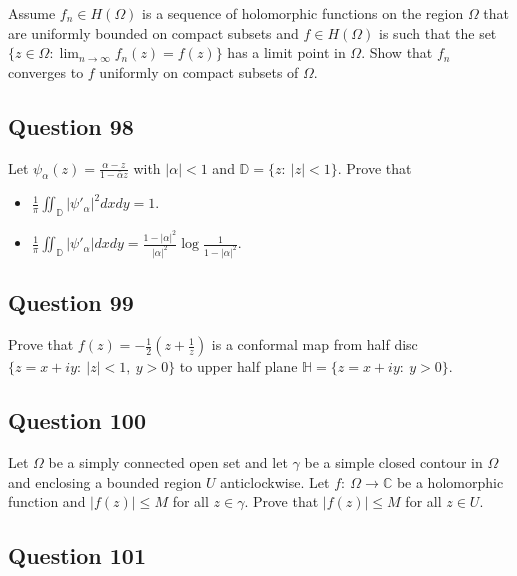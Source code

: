 \documentclass[12pt]{article}
\begin{document}
Assume \(f_n \in H(\Omega)\) is a sequence of holomorphic functions on
the region \(\Omega\) that are uniformly bounded on compact subsets and
\(f \in H(\Omega)\) is such that the set
\(\displaystyle \{z \in \Omega: \lim_{n \rightarrow \infty} f_n(z) = f(z) \}\)
has a limit point in \(\Omega\). Show that \(f_n\) converges to \(f\)
uniformly on compact subsets of \(\Omega\).

\hypertarget{question-98-1}{%
\subsection{Question 98}\label{question-98-1}}

Let \(\displaystyle{\psi_{\alpha}(z)=\frac{\alpha-z}{1-\bar{\alpha}z}}\)
with \(|\alpha|<1\) and \({\mathbb D}=\{z:\ |z|<1\}\). Prove that

\begin{itemize}
\item
  \(\displaystyle{\frac{1}{\pi}\iint_{{\mathbb D}} |\psi'_{\alpha}|^2 dx dy =1}\).
\item
  \(\displaystyle{\frac{1}{\pi}\iint_{{\mathbb D}} |\psi'_{\alpha}| dx dy =\frac{1-|\alpha|^2}{|\alpha|^2} \log \frac{1}{1-|\alpha|^2}}\).
\end{itemize}

\hypertarget{question-99-1}{%
\subsection{Question 99}\label{question-99-1}}

Prove that
\(\displaystyle{f(z)=-\frac{1}{2}\left(z+\frac{1}{z}\right)}\) is a
conformal map from half disc \(\{z=x+iy:\ |z|<1,\ y>0\}\) to upper half
plane \({\mathbb H}=\{z=x+iy:\ y>0\}\).

\hypertarget{question-100-1}{%
\subsection{Question 100}\label{question-100-1}}

Let \(\Omega\) be a simply connected open set and let \(\gamma\) be a
simple closed contour in \(\Omega\) and enclosing a bounded region \(U\)
anticlockwise. Let \(f: \ \Omega \to {\mathbb C}\) be a holomorphic
function and \(|f(z)|\leq M\) for all \(z\in \gamma\). Prove that
\(|f(z)|\leq M\) for all \(z\in U\).

\hypertarget{question-101-1}{%
\subsection{Question 101}\label{question-101-1}}
\end{document}
